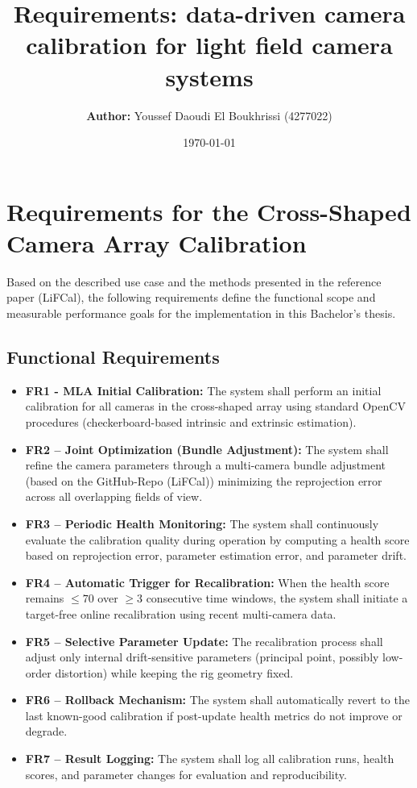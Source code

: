 \documentclass[12pt]{scrartcl}
\title{\vspace{5cm}\textbf{Requirements:} data-driven camera calibration for light field camera systems}
\author{\textbf{Author: } Youssef Daoudi El Boukhrissi (4277022)}
\date{\today}
\begin{document}
\maketitle

\newpage
{}

\section*{Requirements for the Cross-Shaped Camera Array Calibration}

Based on the described use case and the methods presented in the reference paper
(LiFCal),
the following requirements define the functional scope and measurable performance goals
for the implementation in this Bachelor’s thesis.

\subsection*{Functional Requirements}
\begin{itemize}
  \item \textbf{FR1 - MLA Initial Calibration:} 
  The system shall perform an initial calibration for all cameras in the cross-shaped array
  using standard OpenCV procedures (checkerboard-based intrinsic and extrinsic estimation).
  \item \textbf{FR2 – Joint Optimization (Bundle Adjustment):} 
  The system shall refine the camera parameters through a multi-camera bundle adjustment (based on the GitHub-Repo (LiFCal))
  minimizing the reprojection error across all overlapping fields of view.
  \item \textbf{FR3 – Periodic Health Monitoring:} 
  The system shall continuously evaluate the calibration quality during operation by computing
  a health score based on reprojection error, parameter estimation error, and parameter drift.
  \item \textbf{FR4 – Automatic Trigger for Recalibration:}
  When the health score remains $\leq70$ over $\geq3$ consecutive time windows,
  the system shall initiate a target-free online recalibration using recent multi-camera data.
  \item \textbf{FR5 – Selective Parameter Update:}
  The recalibration process shall adjust only internal drift-sensitive parameters
  (principal point, possibly low-order distortion) while keeping the rig geometry fixed.
  \item \textbf{FR6 – Rollback Mechanism:}
  The system shall automatically revert to the last known-good calibration
  if post-update health metrics do not improve or degrade.
  \item \textbf{FR7 – Result Logging:}
  The system shall log all calibration runs, health scores, and parameter changes for evaluation
  and reproducibility.
\end{itemize}
\end{document}
